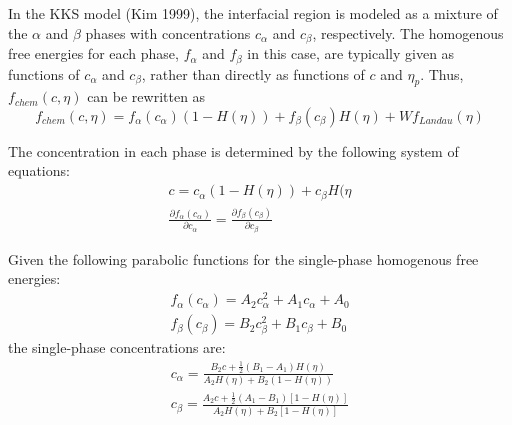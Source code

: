 \documentclass[11pt]{article}
\renewcommand{\=}[1]{\stackrel{#1}{=}} %
\theoremstyle{definition}
\theoremstyle{remark}
\begin{document}
In the KKS model (Kim 1999), the interfacial region is modeled as a mixture of the $\alpha$ and $\beta$ phases with concentrations $c_{\alpha}$ and $c_{\beta}$, respectively. The homogenous free energies for each phase, $f_{\alpha}$ and $f_{\beta}$ in this case, are typically given as functions of $c_{\alpha}$ and $c_{\beta}$, rather than directly as functions of $c$ and $\eta_p$. Thus, $f_{chem}(c, \eta)$ can be rewritten as 
\begin{equation}
f_{chem}(c, \eta) = f_{\alpha}(c_\alpha) \left( 1- H(\eta)\right) + f_{\beta}(c_\beta) H(\eta)+ W f_{Landau}(\eta)
\end{equation}

The concentration in each phase is determined by the following system of equations:
\begin{gather}
c =  c_{\alpha} \left( 1- H(\eta)\right) + c_{\beta} H(\eta \\
\frac{\partial f_{\alpha}(c_{\alpha})}{\partial c_{\alpha}} = \frac{\partial f_{\beta}(c_{\beta})}{\partial c_{\beta}}
\end{gather}

Given the following parabolic functions for the single-phase homogenous free energies:
\begin{gather}
f_{\alpha}(c_{\alpha}) = A_{2} c_{\alpha}^2 + A_{1} c_{\alpha} + A_{0} \\
f_{\beta}(c_{\beta}) = B_{2} c_{\beta}^2 + B_{1} c_{\beta} + B_{0}
\end{gather}
the single-phase concentrations are:
\begin{gather}
c_{\alpha} = \frac{ B_2 c + \frac{1}{2} (B_1 - A_1) H(\eta) }{A_2 H(\eta) + B_2 \left( 1- H(\eta)\right) } \\
c_{\beta} =  \frac{ A_2 c + \frac{1}{2} (A_1 - B_1) \left[1-H(\eta)\right] }{A_2  H(\eta) + B_2 \left[ 1- H(\eta)\right] } 
\end{gather}
\end{document}
